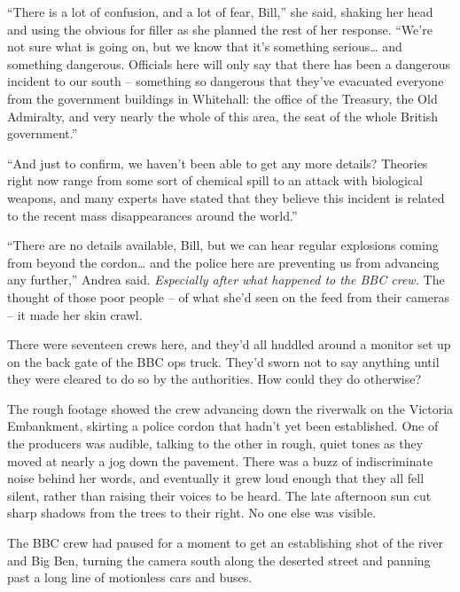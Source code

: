 ``There is a lot of confusion, and a lot of fear, Bill,'' she said,
shaking her head and using the obvious for filler as she planned the
rest of her response. ``We're not sure what is going on, but we know
that it's something serious\ldots{} and something dangerous. Officials
here will only say that there has been a dangerous incident to our south
-- something so dangerous that they've evacuated everyone from the
government buildings in Whitehall: the office of the Treasury, the Old
Admiralty, and very nearly the whole of this area, the seat of the whole
British government.''

``And just to confirm, we haven't been able to get any more details?
Theories right now range from some sort of chemical spill to an attack
with biological weapons, and many experts have stated that they believe
this incident is related to the recent mass disappearances around the
world.''

``There are no details available, Bill, but we can hear regular
explosions coming from beyond the cordon\ldots{} and the police here are
preventing us from advancing any further,'' Andrea said.
\emph{Especially after what happened to the BBC crew.} The thought of
those poor people -- of what she'd seen on the feed from their cameras
-- it made her skin crawl.

There were seventeen crews here, and they'd all huddled around a monitor
set up on the back gate of the BBC ops truck. They'd sworn not to say
anything until they were cleared to do so by the authorities. How could
they do otherwise?

The rough footage showed the crew advancing down the riverwalk on the
Victoria Embankment, skirting a police cordon that hadn't yet been
established. One of the producers was audible, talking to the other in
rough, quiet tones as they moved at nearly a jog down the pavement.
There was a buzz of indiscriminate noise behind her words, and
eventually it grew loud enough that they all fell silent, rather than
raising their voices to be heard. The late afternoon sun cut sharp
shadows from the trees to their right. No one else was visible.

The BBC crew had paused for a moment to get an establishing shot of the
river and Big Ben, turning the camera south along the deserted street
and panning past a long line of motionless cars and buses.

